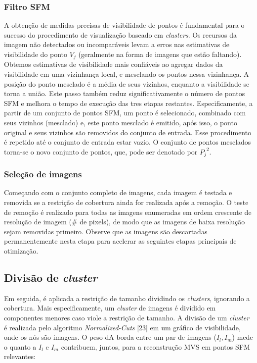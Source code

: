 \begin{itemize}
\subsubsection{Filtro SFM}
A obtenção de medidas precisas de visibilidade de pontos é fundamental para o sucesso do procedimento de visualização baseado em {\it clusters}. Os recursos da imagem não detectados ou incomparáveis levam a erros nas estimativas de visibilidade do ponto $V_j$ (geralmente na forma de imagens que estão faltando). Obtemos estimativas de visibilidade mais confiáveis ao agregar dados da visibilidade em uma vizinhança local, e mesclando os pontos nessa vizinhança. A posição do ponto mesclado é a média de seus vizinhos, enquanto a visibilidade se torna a união. Este passo também reduz significativamente o número de pontos SFM e melhora o tempo de execução das tres etapas restantes. Especificamente, a partir de um conjunto de pontos SFM, um ponto é selecionado, combinado com seus vizinhos (mesclado) e, este ponto mesclado é emitido, após isso, o ponto original e seus vizinhos são removidos do conjunto de entrada. Esse procedimento é repetido até o conjunto de entrada estar vazio. O conjunto de pontos mesclados torna-se o novo conjunto de pontos, que, pode ser denotado por ${P_j}^2$. %

\subsubsection{Seleção de imagens}
Começando com o conjunto completo de imagens, cada imagem é testada e removida se a restrição de cobertura ainda for realizada após a remoção. O teste de remoção é realizado para todas as imagens enumeradas em ordem crescente de resolução de imagem (\# de pixels), de modo que as imagens de baixa resolução sejam removidas primeiro. Observe que as imagens são descartadas permanentemente nesta etapa para acelerar as seguintes etapas principais de otimização.

\subsection{Divisão de {\it cluster}}
Em seguida, é aplicada a restrição de tamanho dividindo os {\it clusters}, ignorando a cobertura. Mais especificamente, um {\it cluster} de imagens é dividido em componentes menores caso viole a restrição de tamanho. A divisão de um {\it cluster} é realizada pelo algoritmo {\it Normalized-Cuts} %
[23] em um gráfico de visibilidade, onde os nós são imagens. O peso dA borda entre um par de imagens ($I_l, I_m$) mede o quanto a $I_l$ e $I_m$ contribuem, juntos,  para a reconstrução MVS em pontos SFM relevantes: 


\end{itemize}
